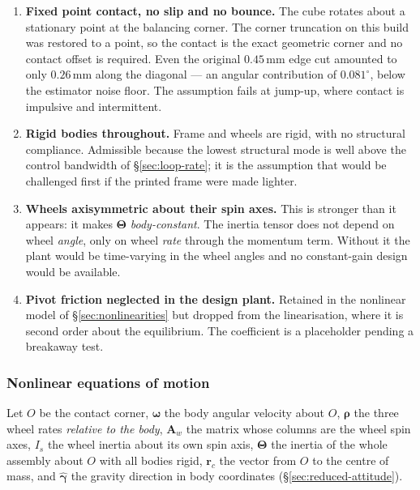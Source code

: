 \begin{enumerate}
  \item \textbf{Fixed point contact, no slip and no bounce.} The cube rotates
        about a stationary point at the balancing corner. The corner
        truncation on this build was restored to a point, so the contact is
        the exact geometric corner and no contact offset is required. Even
        the original $0.45$\,mm edge cut amounted to only $0.26$\,mm along
        the diagonal --- an angular contribution of $0.081^\circ$, below the
        estimator noise floor. The assumption fails at jump-up, where contact
        is impulsive and intermittent.

  \item \textbf{Rigid bodies throughout.} Frame and wheels are rigid, with no
        structural compliance. Admissible because the lowest structural mode
        is well above the control bandwidth of \S\ref{sec:loop-rate}; it is
        the assumption that would be challenged first if the printed frame
        were made lighter.

  \item \textbf{Wheels axisymmetric about their spin axes.} This is stronger
        than it appears: it makes $\bm{\Theta}$ \emph{body-constant}. The
        inertia tensor does not depend on wheel \emph{angle}, only on wheel
        \emph{rate} through the momentum term. Without it the plant would be
        time-varying in the wheel angles and no constant-gain design would be
        available.

  \item \textbf{Pivot friction neglected in the design plant.} Retained in
        the nonlinear model of \S\ref{sec:nonlinearities} but dropped from the
        linearisation, where it is second order about the equilibrium. The
        coefficient is a placeholder pending a breakaway test.
\end{enumerate}

\subsubsection{Nonlinear equations of motion}
\label{sec:nonlinear-eom}

Let $O$ be the contact corner, $\bm{\omega}$ the body angular velocity about
$O$, $\bm{\rho}$ the three wheel rates \emph{relative to the body},
$\bm{A}_w$ the matrix whose columns are the wheel spin axes, $I_s$ the wheel
inertia about its own spin axis, $\bm{\Theta}$ the inertia of the whole
assembly about $O$ with all bodies rigid, $\bm{r}_c$ the vector from $O$ to
the centre of mass, and $\hat{\bm{\gamma}}$ the gravity direction in body
coordinates (\S\ref{sec:reduced-attitude}).

